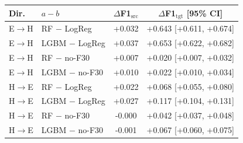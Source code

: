 \begin{tabular}{llcc}
\toprule
Dir. & $a-b$ & $\Delta$F1$_{\mathrm{src}}$ & $\Delta$F1$_{\mathrm{tgt}}$ [95\% CI] \\
\midrule
E$\rightarrow$H & RF $-$ LogReg & +0.032 & +0.643 [+0.611, +0.674] \\
E$\rightarrow$H & LGBM $-$ LogReg & +0.037 & +0.653 [+0.622, +0.682] \\
E$\rightarrow$H & RF $-$ no-F30 & +0.007 & +0.020 [+0.007, +0.032] \\
E$\rightarrow$H & LGBM $-$ no-F30 & +0.010 & +0.022 [+0.010, +0.034] \\
\midrule
H$\rightarrow$E & RF $-$ LogReg & +0.022 & +0.068 [+0.055, +0.080] \\
H$\rightarrow$E & LGBM $-$ LogReg & +0.027 & +0.117 [+0.104, +0.131] \\
H$\rightarrow$E & RF $-$ no-F30 & -0.000 & +0.042 [+0.037, +0.048] \\
H$\rightarrow$E & LGBM $-$ no-F30 & -0.001 & +0.067 [+0.060, +0.075] \\
\bottomrule
\end{tabular}

